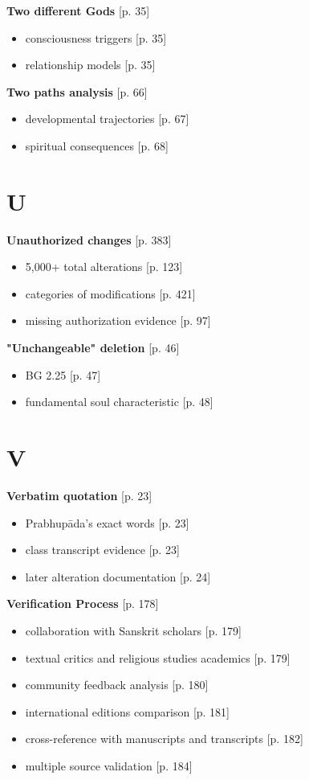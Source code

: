 \documentclass[11pt,twoside]{book}
\begin{document}
\textbf{\textbf{Two different Gods}} {[}p. 35]
\begin{itemize}
\item consciousness triggers [p. 35]
\item relationship models [p. 35]
\end{itemize}

\textbf{\textbf{Two paths analysis}} {[}p. 66]
\begin{itemize}
\item developmental trajectories [p. 67]
\item spiritual consequences [p. 68]
\end{itemize}
\section*{U}
\label{sec:org4bc45c1}

\textbf{\textbf{Unauthorized changes}} {[}p. 383]
\begin{itemize}
\item 5,000+ total alterations [p. 123]
\item categories of modifications [p. 421]
\item missing authorization evidence [p. 97]
\end{itemize}

\textbf{\textbf{"Unchangeable" deletion}} {[}p. 46]
\begin{itemize}
\item BG 2.25 [p. 47]
\item fundamental soul characteristic [p. 48]
\end{itemize}
\section*{V}
\label{sec:org69077fc}

\textbf{\textbf{Verbatim quotation}} {[}p. 23]
\begin{itemize}
\item Prabhupāda's exact words [p. 23]
\item class transcript evidence [p. 23]
\item later alteration documentation [p. 24]
\end{itemize}

\textbf{\textbf{Verification Process}} {[}p. 178]
\begin{itemize}
\item collaboration with Sanskrit scholars [p. 179]
\item textual critics and religious studies academics [p. 179]
\item community feedback analysis [p. 180]
\item international editions comparison [p. 181]
\item cross-reference with manuscripts and transcripts [p. 182]
\item multiple source validation [p. 184]
\end{itemize}
\end{document}
